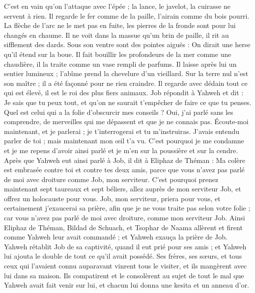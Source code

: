 \begin{multicols}{2}
C'est en vain qu'on l'attaque avec l'épée ; la lance, le javelot, la cuirasse ne servent à rien.
Il regarde le fer comme de la paille, l'airain comme du bois pourri.
La flèche de l'arc ne le met pas en fuite, les pierres de la fronde sont pour lui changés en chaume.
Il ne voit dans la massue qu'un brin de paille, il rit au sifflement des dards.
Sous son ventre sont des pointes aiguës : On dirait une herse qu'il étend sur la boue.
Il fait bouillir les profondeurs de la mer comme une chaudière, il la traite comme un vase rempli de parfums.
Il laisse après lui un sentier lumineux ; l'abîme prend la chevelure d'un vieillard.
Sur la terre nul n'est son maître ; il a été façonné pour ne rien craindre.
Il regarde avec dédain tout ce qui est élevé, il est le roi des plus fiers animaux.
\VerseOne{}Job répondit à Yahweh et dit :
Je sais que tu peux tout, et qu'on ne saurait t'empêcher de faire ce que tu penses.
Quel est celui qui a la folie d'obscurcir mes conseils ? Oui, j'ai parlé sans les comprendre, de merveilles qui me dépassent et que je ne connais pas.
Écoute-moi maintenant, et je parlerai ; je t'interrogerai et tu m'instruiras.
J'avais entendu parler de toi ; mais maintenant mon œil t'a vu.
C'est pourquoi je me condamne et je me repens d'avoir ainsi parlé et je m'en sur la poussière et sur la cendre.
Après que Yahweh eut ainsi parlé à Job, il dit à Eliphaz de Théman : Ma colère est embrasée contre toi et contre tes deux amis, parce que vous n'avez pas parlé de moi avec droiture comme Job, mon serviteur.
 C'est pourquoi prenez maintenant sept taureaux et sept béliers, allez auprès de mon serviteur Job, et offrez un holocauste pour vous. Job, mon serviteur, priera pour vous, et certainement j'exaucerai sa prière, afin que je ne vous traite pas selon votre folie ; car vous n'avez pas parlé de moi avec droiture, comme mon serviteur Job.
 Ainsi Eliphaz de Théman, Bildad de Schuach, et Tsophar de Naama allèrent et firent comme Yahweh leur avait commandé ; et Yahweh exauça la prière de Job.
Yahweh rétablit Job de sa captivité, quand il eut prié pour ses amis ; et Yahweh lui ajouta le double de tout ce qu'il avait possédé.
Ses frères, ses sœurs, et tous ceux qui l'avaient connu auparavant vinrent tous le visiter, et ils mangèrent avec lui dans sa maison. Ils compatirent et le consolèrent au sujet de tout le mal que Yahweh avait fait venir sur lui, et chacun lui donna une kesita et un anneau d'or.

\end{multicols}
